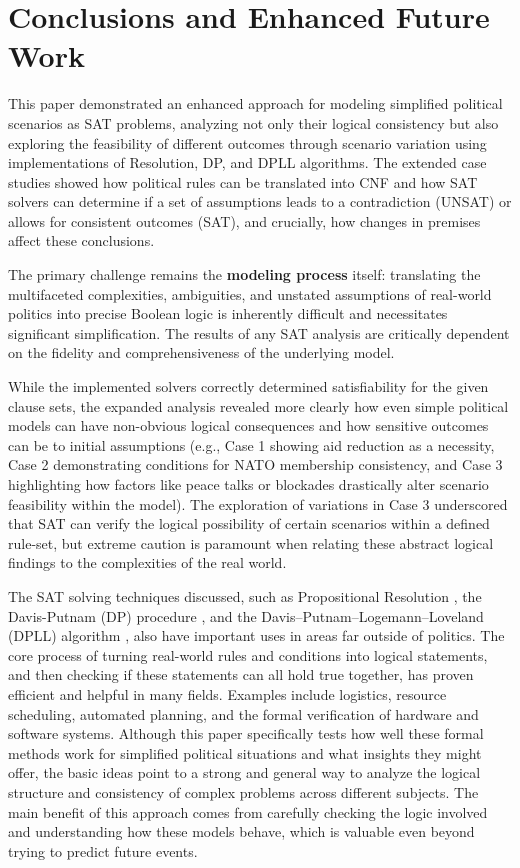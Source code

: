 \documentclass[11pt, a4paper]{article}
\begin{document}
\section{Conclusions and Enhanced Future Work} \label{sec:conclusions}

This paper demonstrated an enhanced approach for modeling simplified political scenarios as SAT problems, analyzing not only their logical consistency but also exploring the feasibility of different outcomes through scenario variation using implementations of Resolution, DP, and DPLL algorithms. The extended case studies showed how political rules can be translated into CNF and how SAT solvers can determine if a set of assumptions leads to a contradiction (UNSAT) or allows for consistent outcomes (SAT), and crucially, how changes in premises affect these conclusions.

The primary challenge remains the \textbf{modeling process} itself: translating the multifaceted complexities, ambiguities, and unstated assumptions of real-world politics into precise Boolean logic is inherently difficult and necessitates significant simplification. The results of any SAT analysis are critically dependent on the fidelity and comprehensiveness of the underlying model.

While the implemented solvers correctly determined satisfiability for the given clause sets, the expanded analysis revealed more clearly how even simple political models can have non-obvious logical consequences and how sensitive outcomes can be to initial assumptions (e.g., Case 1 showing aid reduction as a necessity, Case 2 demonstrating conditions for NATO membership consistency, and Case 3 highlighting how factors like peace talks or blockades drastically alter scenario feasibility within the model). The exploration of variations in Case 3 underscored that SAT can verify the logical possibility of certain scenarios within a defined rule-set, but extreme caution is paramount when relating these abstract logical findings to the complexities of the real world.

The SAT solving techniques discussed, such as Propositional Resolution \cite{Robinson1965}, the Davis-Putnam (DP) procedure \cite{DavisPutnam1960}, and the Davis–Putnam–Logemann–Loveland (DPLL) algorithm \cite{DPLL1962}, also have important uses in areas far outside of politics. The core process of turning real-world rules and conditions into logical statements, and then checking if these statements can all hold true together, has proven efficient and helpful in many fields. Examples include logistics, resource scheduling, automated planning, and the formal verification of hardware and software systems. Although this paper specifically tests how well these formal methods work for simplified political situations and what insights they might offer, the basic ideas point to a strong and general way to analyze the logical structure and consistency of complex problems across different subjects. The main benefit of this approach comes from carefully checking the logic involved and understanding how these models behave, which is valuable even beyond trying to predict future events.
\end{document}
